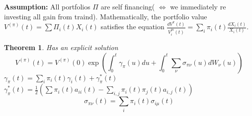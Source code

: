 \documentclass{article} \usepackage[utf8]{inputenc}
\newtheorem{theorem}{Theorem}
\begin{document}
\textbf{Assumption:} All portfolios $\Pi$ are self financing( $\iff$ we immediately re investing all gain from traind).
Mathematically, the portfolio value $V^{(\pi)}(t) = \sum \Pi_i(t) X_i(t)$ satisfies the equation $\frac{dV^{\pi}(t)}{V_i^{pi}(t)} = \sum_{i} \pi_i(t) \frac{dX_i(t)}{X_i(t)}$.

\begin{theorem}
  Has an explicit solution
  $$V^{(\pi)}(t) = V^{(\pi)}(0) \exp( \int_0^t \gamma_{\pi}(u)du + \int_0^t \sum_{\nu} \sigma_{\pi\nu}(u)dW_{\nu}(u))$$
  $\gamma_\pi(t) = \sum_i \pi_i(t) \gamma_i(t) + \gamma_{\pi}^*(t)$
  $\gamma_{\pi}^*(t) = \frac12 (\sum \pi_i(t) a_{ii}(t) - \sum_{i, j} \pi_i(t)\pi_j(t)a_{i,j}(t))$
  $$\sigma_{\pi\nu}(t) = \sum_i \pi_i(t)\sigma_{i\mu}(t)$$
\end{theorem}
\end{document}

